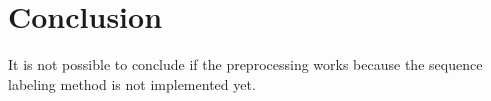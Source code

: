 \documentclass[journal]{IEEETemplate/IEEEtran}
\begin{document}




\section{Conclusion}
It is not possible to conclude if the preprocessing works because the sequence labeling method is not implemented yet. 
\end{document}
